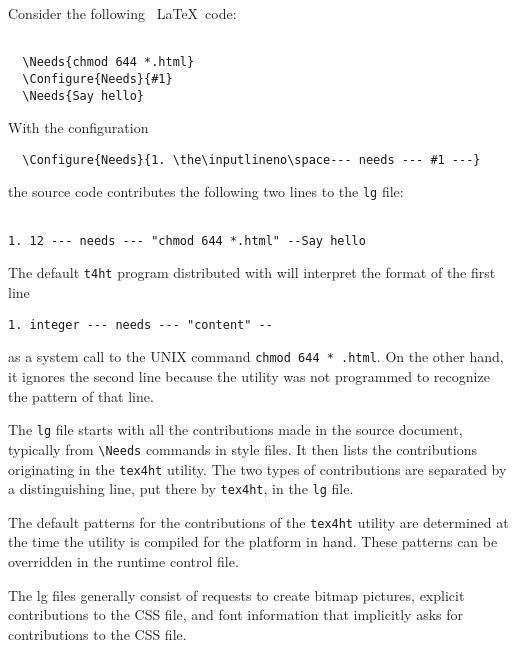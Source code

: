 Consider the following \ \LaTeX\ code: 

\begin{lstlisting}

  \Needs{chmod 644 *.html} 
  \Configure{Needs}{#1} 
  \Needs{Say hello} 

\end{lstlisting}

With the configuration 

\begin{lstlisting}
  \Configure{Needs}{1. \the\inputlineno\space--- needs --- #1 ---} 
\end{lstlisting}

the source code contributes the following two lines to the \verb|lg| file: 

\begin{verbatim}

1. 12 --- needs --- "chmod 644 *.html" --Say hello 

\end{verbatim}

The default \verb|t4ht| program distributed with \texht will interpret the format 
of the first line 

\begin{verbatim}
1. integer --- needs --- "content" --\end{verbatim}

as a system call to the UNIX command \verb|chmod 644 * .html|. On the other hand, it 
ignores the second line because the utility was not programmed to recognize the 
pattern of that line. 


The \verb|lg| file starts with all the contributions made in the source
document, typically from \verb|\Needs| commands in style files. It then
lists the contributions originating in the \verb|tex4ht| utility. The
two types of contributions are separated by a distinguishing line, put
there by \verb|tex4ht|, in the \verb|lg| file. 
 
The default patterns for the contributions of the \verb|tex4ht| utility are determined 
at the time the utility is compiled for the platform in hand. These patterns can be 
overridden in the runtime control file. 

The lg files generally consist of requests to create bitmap pictures,
explicit contributions to the CSS file, and font information that
implicitly asks for contributions to the CSS file. 


